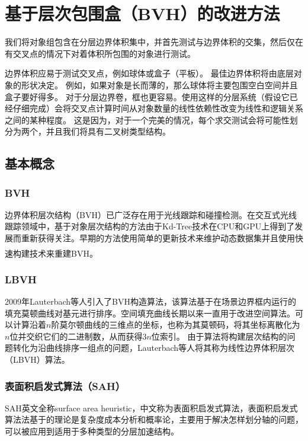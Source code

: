 \documentclass[11pt]{article}
\newcommand{\upcite}[1]{\textsuperscript{\textsuperscript{\cite{#1}}}}
\begin{document}
\section{基于层次包围盒（BVH）的改进方法}
我们将对象组包含在分层边界体积集中，并首先测试与边界体积的交集，然后仅在有交叉点的情况下对着体积所包围的对象进行测试。
\par 边界体积应易于测试交叉点，例如球体或盒子（平板）。 最佳边界体积将由底层对象的形状决定。 例如，如果对象是长而薄的，那么球体将主要包围空白空间并且盒子要好得多。 对于分层边界卷，框也更容易。使用这样的分层系统（假设它已经仔细完成）会将交叉点计算时间从对象数量的线性依赖性改变为线性和逻辑关系之间的某种程度。 这是因为，对于一个完美的情况，每个求交测试会将可能性划分为两个，并且我们将具有二叉树类型结构。
\subsection{基本概念}
\subsubsection{BVH}
边界体积层次结构（BVH）已广泛存在用于光线跟踪和碰撞检测。在交互式光线跟踪领域中，基于对象层次结构的方法由于Kd-Tree技术在CPU和GPU上得到了发展而重新获得关注。早期的方法使用简单的更新技术来维护动态数据集并且使用快速构建技术来重建BVH\upcite{LBVH}。

\subsubsection{LBVH}
2009年Lauterbach等人引入了BVH构造算法，该算法基于在场景边界框内运行的填充莫顿曲线对基元进行排序。空间填充曲线长期以来一直用于改进空间算法。可以计算沿着$n$阶莫尔顿曲线的三维点的坐标，也称为其莫顿码，将其坐标离散化为$n$位并交织它们的二进制数，从而获得$3n$位索引。 由于算法将构建层次结构的问题转化为沿曲线排序一组点的问题，Lauterbach等人将其称为线性边界体积层次（LBVH）算法。

\subsubsection{表面积启发式算法（SAH）}
SAH英文全称surface area heuristic，中文称为表面积启发式算法，表面积启发式算法法基于的理论是复杂度成本分析和概率论，主要用于解决怎样划分轴的问题，可以被应用到适用于多种类型的分层加速结构。
\end{document}
